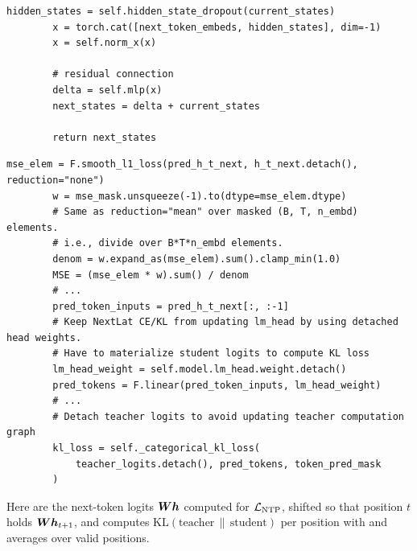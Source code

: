 \begin{lstlisting}[caption={Excerpt from \texttt{repos/\allowbreak JaydenTeoh\_\_NextLat/\allowbreak models/\allowbreak model\_nextlat.py} (\texttt{NextLatDynamicsModel.forward}).},label={lst:c08-nextlat-f}]
        hidden_states = self.hidden_state_dropout(current_states)
        x = torch.cat([next_token_embeds, hidden_states], dim=-1)
        x = self.norm_x(x)

        # residual connection
        delta = self.mlp(x)
        next_states = delta + current_states

        return next_states
\end{lstlisting}

\begin{lstlisting}[caption={Excerpt from \texttt{repos/\allowbreak JaydenTeoh\_\_NextLat/\allowbreak models/\allowbreak model\_nextlat.py} (\texttt{NextLat.\_nextlat\_loss\_function}).},label={lst:c08-nextlat-loss}]
        mse_elem = F.smooth_l1_loss(pred_h_t_next, h_t_next.detach(), reduction="none")
        w = mse_mask.unsqueeze(-1).to(dtype=mse_elem.dtype)
        # Same as reduction="mean" over masked (B, T, n_embd) elements.
        # i.e., divide over B*T*n_embd elements.
        denom = w.expand_as(mse_elem).sum().clamp_min(1.0)
        MSE = (mse_elem * w).sum() / denom
        # ...
        pred_token_inputs = pred_h_t_next[:, :-1]
        # Keep NextLat CE/KL from updating lm_head by using detached head weights.
        # Have to materialize student logits to compute KL loss
        lm_head_weight = self.model.lm_head.weight.detach()
        pred_tokens = F.linear(pred_token_inputs, lm_head_weight)
        # ...
        # Detach teacher logits to avoid updating teacher computation graph
        kl_loss = self._categorical_kl_loss(
            teacher_logits.detach(), pred_tokens, token_pred_mask
        )
\end{lstlisting}

Here  are the next-token logits $\bm{W}\bm{h}$ computed for $\mathcal{L}_{\mathrm{NTP}}$,
shifted so that position $t$ holds $\bm{W}\bm{h}_{t+1}$, and  computes
$\mathrm{KL}(\text{teacher}\,\|\,\text{student})$ per position with  and averages over
valid positions.

